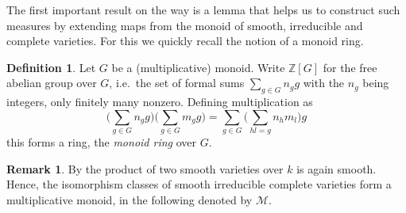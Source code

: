 \documentclass[11pt, a4paper, english, twoside]{article}
\theoremstyle{plain}
\theoremstyle{definition}
\newtheorem{definition}[theorem]{Definition}
\newtheorem{remark}[theorem]{Remark}
\begin{document}
The first important result on the way is a lemma that helps us to construct such measures by extending maps from the monoid of smooth, irreducible
and complete varieties. For this we quickly recall the notion of a monoid ring.

\begin{definition}
    Let $G$ be a (multiplicative) monoid. Write $\mathbb{Z}[G]$ for the free abelian group over $G$, i.e.\ the set of formal sums
    $\sum_{g \in G} n_g g$ with the $n_g$ being integers, only finitely many nonzero.
    Defining multiplication as
    \[
        \Big(\sum_{g \in G} n_g g\Big)\Big(\sum_{g \in G} m_g g \Big) = \sum_{g \in G} \Big(\sum_{hl = g} n_h m_l\Big) g
    \]
    this forms a ring, the \emph{monoid ring} over $G$.
\end{definition}

\begin{remark}
    By \cite[Prop. 10.1 (d)]{Ha} the product of two smooth varieties over $k$ is again smooth. Hence, the isomorphism classes of smooth
    irreducible complete varieties form a multiplicative monoid, in the following denoted by $\mathcal{M}$.
\end{remark}
\end{document}
